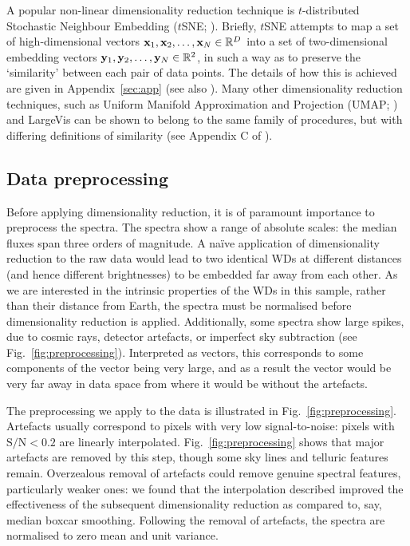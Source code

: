 \documentclass[fleqn,usenatbib]{mnras}
\def\xb{\vb{x}}
\def\yb{\vb{y}}
\begin{document}
A popular non-linear dimensionality reduction technique is $t$-distributed Stochastic Neighbour Embedding ($t$SNE; \citealt{tsne}).
Briefly, $t$SNE attempts to map a set of high-dimensional vectors $\xb_1, \xb_2, \dots, \xb_N \in \mathbb{R}^D$ into a set of two-dimensional embedding vectors $\yb_1, \yb_2, \dots, \yb_N \in \mathbb{R}^2$, in such a way as to preserve the `similarity' between each pair of data points.
The details of how this is achieved are given in Appendix~\ref{sec:app} (see also \citealt{tsne}).
Many other dimensionality reduction techniques, such as Uniform Manifold Approximation and Projection (UMAP; \citealt{umap}) and LargeVis \citep{largevis} can be shown to belong to the same family of procedures, but with differing definitions of similarity (see Appendix C of \citealt{umap}).


\subsection{Data preprocessing}
\label{sec:preprocessing}

Before applying dimensionality reduction, it is of paramount importance to preprocess the spectra.
The spectra show a range of absolute scales: the median fluxes span three orders of magnitude.
A na\"{i}ve application of dimensionality reduction to the raw data would lead to two identical WDs at different distances (and hence different brightnesses) to be embedded far away from each other.
As we are interested in the intrinsic properties of the WDs in this sample, rather than their distance from Earth, the spectra must be normalised before dimensionality reduction is applied.
Additionally, some spectra show large spikes, due to cosmic rays, detector artefacts, or imperfect sky subtraction (see Fig.~\ref{fig:preprocessing}).
Interpreted as vectors, this corresponds to some components of the vector being very large, and as a result the vector would be very far away in data space from where it would be without the artefacts.

The preprocessing we apply to the data is illustrated in Fig.~\ref{fig:preprocessing}.
Artefacts usually correspond to pixels with very low signal-to-noise: pixels with $\mathrm{S}/\mathrm{N}<0.2$ are linearly interpolated.
Fig.~\ref{fig:preprocessing} shows that major artefacts are removed by this step, though some sky lines and telluric features remain.
Overzealous removal of artefacts could remove genuine spectral features, particularly weaker ones: we found that the interpolation described improved the effectiveness of the subsequent dimensionality reduction as compared to, say, median boxcar smoothing.
Following the removal of artefacts, the spectra are normalised to zero mean and unit variance.
\end{document}
